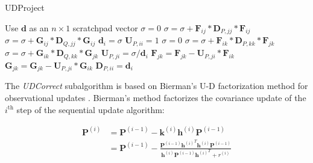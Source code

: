 \begin{algorithm}
    \caption{UDProject}
    \label{alg:UDProject}
    \begin{algorithmic}
        \STATE Use $\mathbf{d}$ as an $n \times 1$ scratchpad vector
            \STATE $\sigma = 0$
                \STATE $\sigma = \sigma + \mathbf{F}_{ij} * \mathbf{D}_{P,jj} * \mathbf{F}_{ij}$
            \ENDFOR
                \STATE $\sigma = \sigma + \mathbf{G}_{ij} * \mathbf{D}_{Q,jj} * \mathbf{G}_{ij}$
            \ENDFOR
            \STATE $\mathbf{d}_{i} = \sigma$
            \STATE $\mathbf{U}_{P,ii} = 1$
                \STATE $\sigma = 0$
                    \STATE $\sigma = \sigma + \mathbf{F}_{ik} * \mathbf{D}_{P,kk} * \mathbf{F}_{jk}$
                \ENDFOR
                    \STATE $\sigma = \sigma + \mathbf{G}_{ik} * \mathbf{D}_{Q,kk} * \mathbf{G}_{jk}$
                \ENDFOR
                \STATE $\mathbf{U}_{P,ji} = \sigma / \mathbf{d}_{i}$
                    \STATE $\mathbf{F}_{jk} = \mathbf{F}_{jk} - \mathbf{U}_{P,ji} * \mathbf{F}_{ik}$
                \ENDFOR
                    \STATE $\mathbf{G}_{jk} = \mathbf{G}_{jk} - \mathbf{U}_{P,ji} * \mathbf{G}_{ik}$
                \ENDFOR
            \ENDFOR
        \ENDFOR
            \STATE $\mathbf{D}_{P,ii} = \mathbf{d}_{i}$
        \ENDFOR
    \end{algorithmic}
\end{algorithm}

The \textit{UDCorrect} subalgorithm is based on Bierman’s U-D factorization method for
observational updates \cite{bierman1977}. Bierman’s method factorizes the covariance update
of the $i^{\text{th}}$ step of the sequential update algorithm:

\begin{equation*}
    \begin{aligned}
        \mathbf{P}^{(i)} &= \mathbf{P}^{(i-1)} - \mathbf{k}^{(i)} \mathbf{h}^{(i)} \mathbf{P}^{(i-1)} \\
        &= \mathbf{P}^{(i-1)} - \frac { \mathbf{P}^{(i-1)} {\mathbf{h}^{(i)}}^T \mathbf{h}^{(i)} \mathbf{P}^{(i-1)}} { \mathbf{h}^{(i)} \mathbf{P}^{(i-1)} {\mathbf{h}^{(i)}}^T + r^{(i)} }  \\
    \end{aligned}
\end{equation*}

